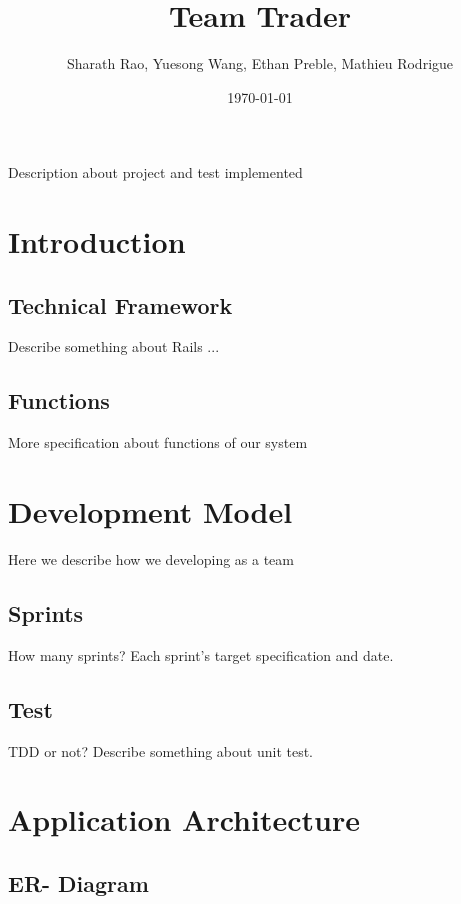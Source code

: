 \documentclass[dvips,12pt]{article}
\begin{document}
\title{Team Trader}
\author{Sharath Rao, Yuesong Wang, Ethan Preble, Mathieu Rodrigue}
\date{\today}

\maketitle

%
Description about project and test implemented
\newpage

\section{Introduction}


\subsection{Technical Framework}

Describe something about Rails ...


\subsection{Functions}
More specification about functions of our system


\newpage

\section{Development Model}
Here we describe how we developing as a team
\subsection{Sprints}
How many sprints? Each sprint's target specification and date.

\subsection{Test}
TDD or not? Describe something about unit test.


\newpage

\section{Application Architecture}
\subsection{ER- Diagram}
\end{document}
